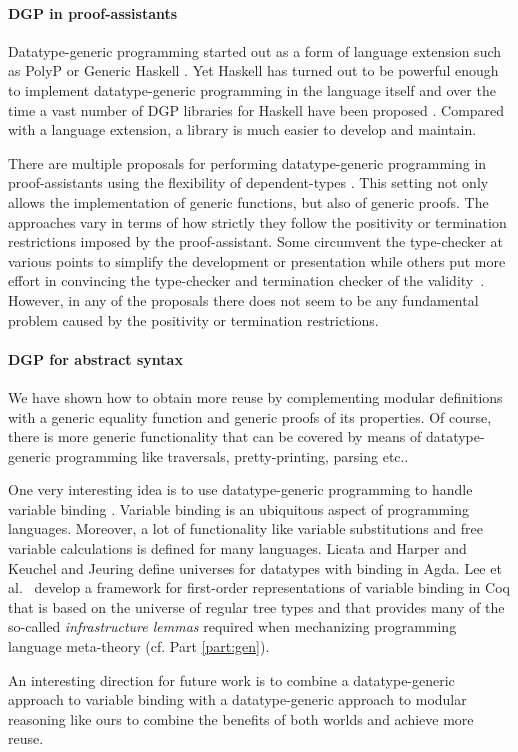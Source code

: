 
\paragraph{DGP in proof-assistants}
Datatype-generic programming started out as a form of language extension such as
PolyP \cite{jansson:polyp} or Generic Haskell \cite{loh:dsgh}. Yet Haskell has
turned out to be powerful enough to implement datatype-generic programming in
the language itself and over the time a vast number of DGP libraries for Haskell
have been proposed
\cite{cheney:ligd,syb,emgm,multirec,instantgenerics,uniplate,genericderiving}. Compared
with a language extension, a library is much easier to develop and maintain.

There are multiple proposals for performing datatype-generic programming in
proof-assistants using the flexibility of dependent-types
\cite{dgpcoq,altenkirch:gpwdtp,benke:universes,loh:gpif,indexedcontainers}. This
setting not only allows the implementation of generic functions, but also of
generic proofs. The approaches vary in terms of how strictly they follow the
positivity or termination restrictions imposed by the proof-assistant. Some
circumvent the type-checker at various points to simplify the development or
presentation while others put more effort in convincing the type-checker and
termination checker of the validity~\cite{ertt}. However, in any of the
proposals there does not seem to be any fundamental problem caused by the
positivity or termination restrictions.

\paragraph{DGP for abstract syntax}
We have shown how to obtain more reuse by complementing modular definitions with
a generic equality function and generic proofs of its properties. Of course,
there is more generic functionality that can be covered by means of
datatype-generic programming like traversals, pretty-printing, parsing
etc..

One very interesting idea is to use datatype-generic programming to handle
variable binding \cite{cheney:synp,unbound}. Variable binding is an ubiquitous
aspect of programming languages. Moreover, a lot of functionality like variable
substitutions and free variable calculations is defined for many
languages. Licata and Harper \cite{licata:ubc} and Keuchel and Jeuring
\cite{sk:gcasr} define universes for datatypes with binding in Agda. Lee et
al.~\cite{gmeta} develop a framework for first-order representations of variable
binding in Coq that is based on the universe of regular tree types \cite{ertt}
and that provides many of the so-called \emph{infrastructure lemmas} required
when mechanizing programming language meta-theory (cf. Part \ref{part:gen}).

An interesting direction for future work is to combine a datatype-generic
approach to variable binding with a datatype-generic approach to modular
reasoning like ours to combine the benefits of both worlds and achieve more
reuse.

